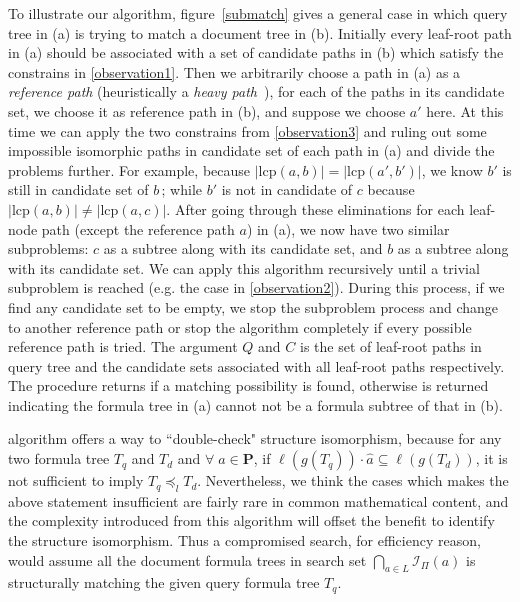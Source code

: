\documentclass{acm_proc_article-sp}
\begin{document}
To illustrate our  algorithm, figure~\ref{submatch} gives a general case in which query tree in (a) is trying to match a document tree in (b).
Initially every leaf-root path in (a) should be associated with a set of candidate paths in (b) which satisfy the constrains in \ref{observation1}.
Then we arbitrarily choose a path in (a) as a \textit{reference path} (heuristically a \textit{heavy path}~\cite{heavypathde}), for each of the paths in its candidate set, we choose it as reference path in (b), and suppose we choose $a'$ here. At this time we can apply the two constrains from \ref{observation3} and ruling out some impossible isomorphic paths in candidate set of each path in (a) and divide the problems further. 
For example, because $\left| \mathrm{lcp}(a,b) \right| = \left| \mathrm{lcp}(a',b') \right|$, we know $b'$ is still in candidate set of $b\,$; while $b'$ is not in candidate of $c$ because $\left| \mathrm{lcp}(a,b) \right| \neq \left| \mathrm{lcp}(a,c) \right|$. 
After going through these eliminations for each leaf-node path (except the reference path $a$) in (a), we now have two similar subproblems: $c$ as a subtree along with its candidate set, and $b$ as a subtree along with its candidate set. 
We can apply this algorithm recursively until a trivial subproblem is reached (e.g. the case in \ref{observation2}). During this process, if we find any candidate set to be empty, we stop the subproblem process and change to another reference path or stop the algorithm completely if every possible reference path is tried.
The argument $Q$ and $C$ is the set of leaf-root paths in query tree and the candidate sets associated with all leaf-root paths respectively.
The procedure returns  if a matching possibility is found, otherwise  is returned indicating the formula tree in (a) cannot not be a formula subtree of that in (b).

 algorithm offers a way to ``double-check" structure isomorphism, because 
for any two formula tree $T_q$ and $T_d$ and $\forall\; \hat{a} \in \mathbf{P}$, if $\ell(g(T_q)) \cdot \hat{a} \subseteq \ell(g(T_d))$, it is not sufficient to imply $T_q \preceq_l T_d$.
Nevertheless, we think the cases which makes the above statement insufficient are fairly rare in common mathematical content, and the complexity introduced from this algorithm will offset the benefit to identify the structure isomorphism.
Thus a compromised search, for efficiency reason, would assume all the document formula trees in search set
$\bigcap_{a \in L} \mathcal{I}_{\Pi}(a)$ is structurally matching the given query formula tree $T_q$.
\end{document}

